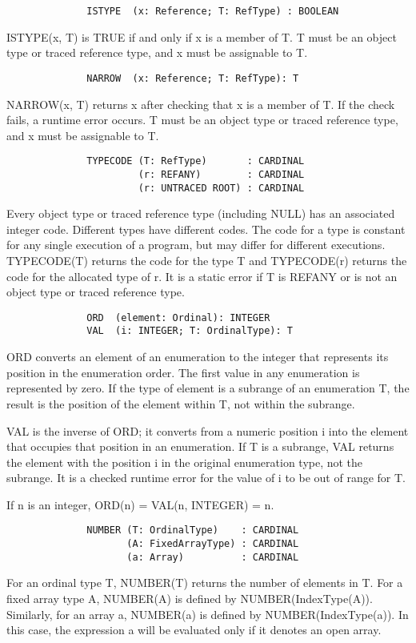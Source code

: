 \documentclass[10pt]{article}
\begin{document}
\begin{verbatim}
              ISTYPE  (x: Reference; T: RefType) : BOOLEAN
\end{verbatim}
ISTYPE(x, T) is TRUE if and only if x is a member of T.  T must be an object
type or traced reference type, and x must be assignable to T.
\begin{verbatim}
              NARROW  (x: Reference; T: RefType): T
\end{verbatim}
NARROW(x, T) returns x after checking that x is a member of T.  If the check
fails, a runtime error occurs.  T must be an object type or traced reference
type, and x must be assignable to T.

\begin{verbatim}
              TYPECODE (T: RefType)       : CARDINAL
                       (r: REFANY)        : CARDINAL
                       (r: UNTRACED ROOT) : CARDINAL
\end{verbatim}
Every object type or traced reference type (including NULL) has an associated
integer code.  Different types have different codes.  The code for a type is
constant for any single execution of a program, but may differ for different
executions.  TYPECODE(T) returns the code for the type T and TYPECODE(r)
returns the code for the allocated type of r.  It is a static error if T is
REFANY or is not an object type or traced reference type.

\begin{verbatim}
              ORD  (element: Ordinal): INTEGER
              VAL  (i: INTEGER; T: OrdinalType): T
\end{verbatim}
ORD converts an element of an enumeration to the integer that represents its
position in the enumeration order.  The first value in any enumeration is
represented by zero.  If the type of element is a subrange of an enumeration T,
the result is the position of the element within T, not within the subrange.

VAL is the inverse of ORD; it converts from a numeric position i into the
element that occupies that position in an enumeration.  If T is a subrange, VAL
returns the element with the position i in the original enumeration type, not
the subrange.  It is a checked runtime error for the value of i to be out of
range for T.

If n is an integer, ORD(n) = VAL(n, INTEGER) = n.

\begin{verbatim}
              NUMBER (T: OrdinalType)    : CARDINAL
                     (A: FixedArrayType) : CARDINAL
                     (a: Array)          : CARDINAL
\end{verbatim}
For an ordinal type T, NUMBER(T) returns the number of elements in T.  For a
fixed array type A, NUMBER(A) is defined by NUMBER(IndexType(A)).  Similarly,
for an array a, NUMBER(a) is defined by NUMBER(IndexType(a)).  In this case,
the expression a will be evaluated only if it denotes an open array.
\end{document}
